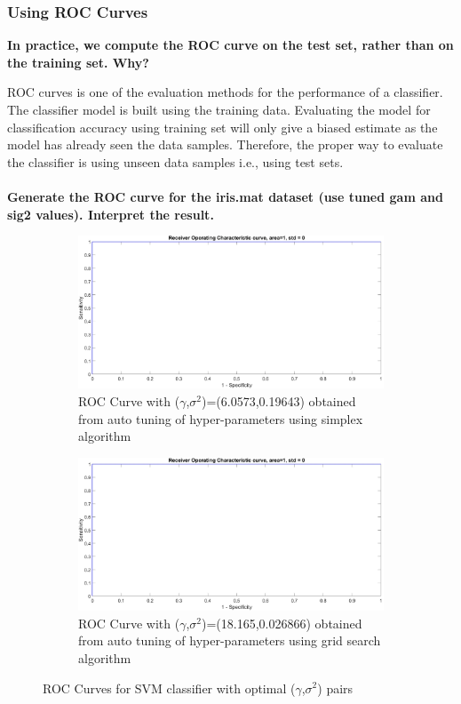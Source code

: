 {\subsubsection{Using ROC Curves}
\textbf{ In practice, we compute the ROC curve on the test set, rather than on the training set. Why?}

ROC curves is one of the evaluation methods for the performance of a classifier. The classifier model is built using the training data. Evaluating the model for classification accuracy using training set will only give a biased estimate as the model has already seen the data samples. Therefore, the proper way to evaluate the classifier is using unseen data samples i.e., using test sets.\\\\
\textbf{Generate the ROC curve for the iris.mat dataset (use tuned gam and sig2 values). Interpret the result.}
\begin{figure}[!ht]
	\begin{subfigure}{0.5\linewidth}
		\centering
		\captionsetup{width=.8\linewidth}
		\includegraphics[width=0.8\linewidth]{Exercise1/Report/Ex1.3_ROC_simplex}
		\caption{ROC Curve with ($\gamma$,$\sigma^2$)=(6.0573,0.19643) obtained from auto tuning of hyper-parameters using simplex algorithm}
		\label{fig:ROC_simplex}\par\vfill
	\end{subfigure}%
	\begin{subfigure}{0.5\linewidth}
		\centering
		\captionsetup{width=.8\linewidth}
		\includegraphics[width=0.8\linewidth]{Exercise1/Report/EX1.3_ROC_grid.jpg}
		\caption{ROC Curve with ($\gamma$,$\sigma^2$)=(18.165,0.026866) obtained from auto tuning of hyper-parameters using grid search algorithm}
		\label{fig:ROC_grid}
	\end{subfigure}
	\caption{ROC Curves for SVM classifier with optimal ($\gamma$,$\sigma^2$) pairs}
	\label{fig:ROC}
\end{figure}

}

